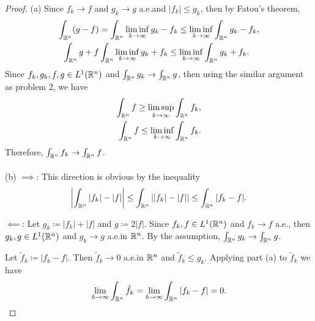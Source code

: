 \begin{proof}
(a) Since $f_k\to f$ and $g_k\to g$ a.e.\@ and $|f_k|\leq g_k$, then by
Fatou's theorem,
\begin{align*}
\int_{\mathbb{R}^n}(g-f)
&=\int_{\mathbb{R}^n}\liminf_{k\to\infty} g_k-f_k
\leq\liminf_{k\to\infty}\int_{\mathbb{R}^n}g_k-f_k,\\
\int_{\mathbb{R}^n}g+f&\int_{\mathbb{R}^n}\liminf_{k\to\infty}g_k+f_k\leq\liminf_{k\to\infty}\int_{\mathbb{R}^n}g_k+f_k.
\end{align*}
Since $f_k,g_k,f,g\in L^1(\mathbb{R}^n)$ and $\int_{\mathbb{R}^n}g_k\to\int_{\mathbb{R}^n}g$,
then using the similar argument as problem 2, we have
\[
  \begin{aligned}
   \int_{\mathbb{R}^n}f\geq\limsup_{k\to\infty}\int_{\mathbb{R}^n}f_k,\\
   \int_{\mathbb{R}^n}f\leq\liminf_{k\to\infty}\int_{\mathbb{R}^n} f_k.
  \end{aligned}
\]
Therefore, $\int_{\mathbb{R}^n}f_k\to\int_{\mathbb{R}^n} f$.
\\\\
(b) $\implies$: This direction is obvious by the inequality
\[
\left|\int_{\mathbb{R}^n}|f_k|-|f|\right|\leq\int_{\mathbb{R}^n}\left||f_k|-|f|\right|\leq\int_{\mathbb{R}^n}|f_k-f|.
\]

$\impliedby$: Let $g_k\coloneqq |f_k|+|f|$ and $g\coloneqq 2|f|$. Since
$f_k,f\in L^1(\mathbb{R}^n)$ and $f_k\to f$ a.e., then $g_k,g\in L^1(\mathbb{R}^n)$ and
$g_k\to g$ a.e.\@ in $\mathbb{R}^n$. By the assumption, $\int_{\mathbb{R}^n}
g_k\to\int_{\mathbb{R}^n}g$.

Let $\tilde f_k\coloneqq|f_k-f|$. Then $\tilde f_k\to 0$ a.e.\@ in $\mathbb{R}^n$
and $\tilde f_k\leq g_k$. Applying part (a) to $\tilde f_k$ we have
\[
\lim_{k\to\infty}\int_{\mathbb{R}^n}\tilde f_k=\lim_{k\to\infty}\int_{\mathbb{R}^n}|f_k-f|=0.
\]
\end{proof}
